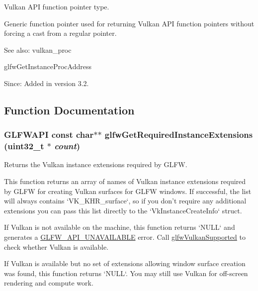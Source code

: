 Vulkan API function pointer type. 

Generic function pointer used for returning Vulkan API function pointers without forcing a cast from a regular pointer.

\begin{Desc}
\item[See also:]vulkan\_\-proc 

glfwGetInstanceProcAddress\end{Desc}
\begin{Desc}
\item[Since:]Added in version 3.2. \end{Desc}


\subsection{Function Documentation}
\hypertarget{group__vulkan_g70adaf0cfc99adc484c49ea99e17c2cf}{
\subsubsection[glfwGetRequiredInstanceExtensions]{\setlength{\rightskip}{0pt plus 5cm}GLFWAPI const char$\ast$$\ast$ glfwGetRequiredInstanceExtensions (uint32\_\-t $\ast$ {\em count})}}
\label{group__vulkan_g70adaf0cfc99adc484c49ea99e17c2cf}


Returns the Vulkan instance extensions required by GLFW. 

This function returns an array of names of Vulkan instance extensions required by GLFW for creating Vulkan surfaces for GLFW windows. If successful, the list will always contains `VK\_\-KHR\_\-surface`, so if you don't require any additional extensions you can pass this list directly to the `VkInstanceCreateInfo` struct.

If Vulkan is not available on the machine, this function returns `NULL` and generates a \hyperlink{group__errors_g56882b290db23261cc6c053c40c2d08e}{GLFW\_\-API\_\-UNAVAILABLE} error. Call \hyperlink{group__vulkan_g72e7c3757d9ff2333181a5569bb7c403}{glfwVulkanSupported} to check whether Vulkan is available.

If Vulkan is available but no set of extensions allowing window surface creation was found, this function returns `NULL`. You may still use Vulkan for off-screen rendering and compute work.

